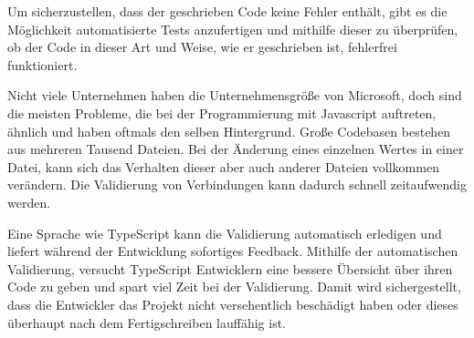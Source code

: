 Um sicherzustellen, dass der geschrieben Code keine Fehler enthält, gibt es die Möglichkeit automatisierte Tests anzufertigen und mithilfe dieser zu überprüfen, ob der Code in dieser Art und Weise, wie er geschrieben ist, fehlerfrei funktioniert. \cite{ScriptWiki}


Nicht viele Unternehmen haben die Unternehmensgröße von Microsoft, doch sind die meisten Probleme, die bei der Programmierung mit Javascript auftreten, ähnlich und haben oftmals den selben Hintergrund. Große Codebasen bestehen aus mehreren Tausend Dateien. Bei der Änderung eines einzelnen Wertes in einer Datei, kann sich das Verhalten dieser aber auch anderer Dateien vollkommen verändern.
Die Validierung von Verbindungen kann dadurch schnell zeitaufwendig werden. \cite{ScriptWiki}


Eine Sprache wie TypeScript kann die Validierung automatisch erledigen und liefert während der Entwicklung sofortiges Feedback. Mithilfe der automatischen Validierung, versucht TypeScript Entwicklern eine bessere Übersicht über ihren Code zu geben und spart viel Zeit bei der Validierung. Damit wird sichergestellt, dass die Entwickler das Projekt nicht versehentlich beschädigt haben oder dieses überhaupt nach dem Fertigschreiben lauffähig ist. \cite{ScriptWiki}
